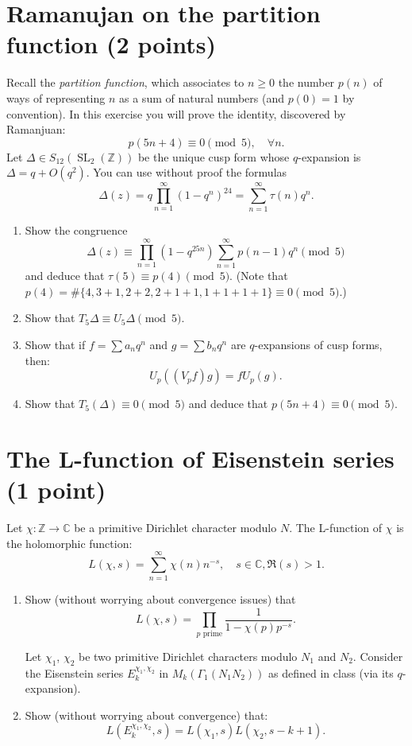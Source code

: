 \documentclass[paper=a4, fontsize=11pt]{scrartcl} %
\numberwithin{equation}{section} %
\numberwithin{figure}{section} %
\numberwithin{table}{section} %
\newcommand{\bbC}{\mathbb{C}}
\newcommand{\bbZ}{\mathbb{Z}}
\newcommand{\CC}{\bbC}
\newcommand{\ZZ}{\bbZ}
\DeclareMathOperator{\SL}{SL}
\begin{document}
\section{Ramanujan on the partition function  (2 points)}
Recall the \emph{partition function}, which associates to $n\geq 0$ the number
$p(n)$ of ways of representing $n$ as a sum of natural numbers (and $p(0)=1$ by convention). In this exercise you will prove the identity, discovered by Ramanjuan:
\[
p(5n+4)\equiv 0\pmod{5},\quad\forall n.
\]
Let $\Delta\in S_{12}(\SL_2(\ZZ))$ be the unique cusp form whose $q$-expansion is $\Delta = q + O(q^2)$. You can use without proof the formulas
\[
\Delta(z) = q\prod_{n=1}^\infty (1-q^n)^{24}=\sum_{n=1}^\infty \tau(n)q^n.
\]
\begin{enumerate}
\item Show the congruence
\[
\Delta(z)\equiv \prod_{n=1}^\infty (1-q^{25n})\sum_{n=1}^\infty p(n-1)q^n\pmod{5}
\]
and deduce that $\tau(5)\equiv p(4)\pmod{5}$. (Note that $p(4)=\#\{4, 3+1, 2+2, 2+1+1, 1+1+1+1\}\equiv 0\pmod 5$.)
\item Show that $T_5\Delta \equiv U_5\Delta\pmod{5}$.
\item Show that if $f=\sum a_nq^n$ and $g=\sum b_nq^n$ are $q$-expansions of cusp forms, then:
\[
U_p((V_pf)g) = fU_p(g).
\]
\item Show that $T_5(\Delta)\equiv 0\pmod 5$ and deduce that $p(5n+4)\equiv 0\pmod 5$.
\end{enumerate}

\section{The L-function of Eisenstein series  (1 point)}

Let $\chi\colon\ZZ\to \CC$ be  a primitive Dirichlet character modulo $N$. The L-function of $\chi$ is the holomorphic function:
\[
L(\chi,s)=\sum_{n=1}^\infty \chi(n)n^{-s},\quad s\in \CC,\Re(s)>1.
\]
\begin{enumerate}
\item Show (without worrying about convergence issues) that
\[
L(\chi,s)=\prod_{p\text{ prime}} \frac{1}{1-\chi(p)p^{-s}}.
\]

Let $\chi_1$, $\chi_2$ be two primitive Dirichlet characters modulo $N_1$ and $N_2$. Consider the Eisenstein series $E_k^{\chi_1,\chi_2}$ in $M_k(\Gamma_1(N_1N_2))$ as defined in class (via its $q$-expansion).
\item Show (without worrying about convergence) that:
\[
L(E_k^{\chi_1,\chi_2},s) = L(\chi_1,s)L(\chi_2,s-k+1).
\]
\end{enumerate}
\end{document}
